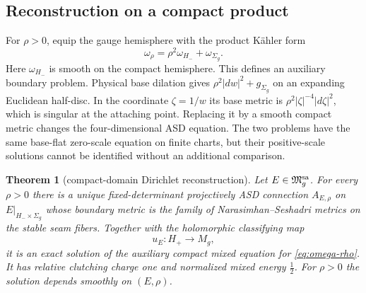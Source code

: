 \documentclass[11pt]{amsart}
\newtheorem{theorem}{Theorem}[section]
\theoremstyle{definition}
\theoremstyle{remark}
\theoremstyle{plain}
\newcommand{\frakM}{\mathfrak{M}}
\begin{document}
\subsection{Reconstruction on a compact product}\label{sec:exact-reconstruction}
For $\rho>0$, equip the gauge hemisphere with the product K\"ahler form
\begin{equation}\label{eq:omega-rho}
                    \omega_\rho=\rho^2\omega_{H_-}+\omega_{\Sigma_g}.
\end{equation}
Here $\omega_{H_-}$ is smooth on the compact hemisphere. This defines an
auxiliary boundary problem. Physical base dilation gives
$\rho^2|dw|^2+g_{\Sigma_g}$ on an expanding Euclidean half-disc. In the
coordinate $\zeta=1/w$ its base metric is
$\rho^2|\zeta|^{-4}|d\zeta|^2$, which is singular at the attaching point.
Replacing it by a smooth compact metric changes the four-dimensional ASD
equation. The two problems have the same base-flat zero-scale equation
on finite charts, but their positive-scale solutions cannot be identified
without an additional comparison.

\begin{theorem}[compact-domain Dirichlet reconstruction]\label{thm:reconstruction}
Let $E\in\frakM_g^{\rm sa}$.  For every $\rho>0$ there is a unique
fixed-determinant projectively ASD connection $A_{E,\rho}$ on
$E|_{H_-\times\Sigma_g}$ whose boundary metric is the family of
Narasimhan--Seshadri metrics on the stable seam fibers.  Together with the
holomorphic classifying map
\[
                         u_E:H_+\longrightarrow M_g,
\]
it is an exact solution of the auxiliary compact mixed equation for
\eqref{eq:omega-rho}. It has
relative clutching charge one and normalized mixed energy $\frac12$.  For
$\rho>0$ the solution depends smoothly on $(E,\rho)$.
\end{theorem}
\end{document}
